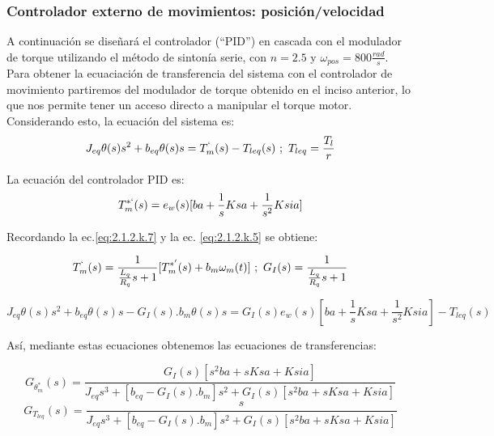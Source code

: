 \documentclass[10pt]{article}
\begin{document}
\subsubsection{Controlador externo de movimientos: posición/velocidad }
A continuación se diseñará el controlador (``PID'') en cascada con el modulador de torque utilizando el método de sintonía serie, con $n=2.5$ y $\omega_{pos}=800\frac{rad}{s}$. Para obtener la ecuaciación de transferencia del sistema con el controlador de movimiento partiremos del modulador de torque obtenido en el inciso anterior, lo que nos permite tener un acceso directo a manipular el torque motor. Considerando esto, la ecuación del sistema es:
		\begin{equation}
	J_{eq}\theta(s)s^{2}+b_{eq}\theta(s)s=T^{`}_{m}(s)-T_{leq}(s) \ ; \ T_{leq}= \frac{T_{l}}{r}
	\label{eq:2.1.2.q.1}
	\end{equation}
	
La ecuación del controlador PID es:
		\begin{equation}
	T^{*`}_{m}(s)=e_{w}(s)[ba+\frac{1}{s}Ksa + \frac{1}{s^{2}}Ksia]
	\label{eq:2.1.2.q.2}
	\end{equation}
	
Recordando la ec.\ref{eq:2.1.2.k.7} y la ec. \ref{eq:2.1.2.k.5} se obtiene:

	\begin{equation}
	T^{`}_{m}(s)=\frac{1}{\frac{L_{q}}{R_{q}}s+1}[T^{*'}_{m}(s)+b_{m}\omega_{m}(t)] \ ; \ G_{I}(s)=\frac{1}{\frac{L_{q}}{R_{q}}s+1}
	\label{eq:2.1.2.q.4}
	\end{equation}

	\begin{equation}
	J_{eq}\theta(s)s^{2}+b_{eq}\theta(s)s-G_{I}(s).b_{m}\theta(s)s=G_{I}(s)e_{w}(s)[ba+\frac{1}{s}Ksa + \frac{1}{s^{2}}Ksia]-T_{leq}(s)
	\label{eq:2.1.2.q.5}
	\end{equation}
	
Así, mediante estas ecuaciones obtenemos las ecuaciones de transferencias:
 
	\begin{equation}
	G_{\theta^{*}_{m}}(s)=\frac{G_{I}(s)[s^{2}ba+sKsa+Ksia]}{J_{eq}s^{3}+[b_{eq}-G_{I}(s).b_{m}]s^{2}+G_{I}(s)[s^{2}ba+sKsa+Ksia]}
	\label{eq:2.1.2.q.6}
	\end{equation}
 	\begin{equation}
	G_{T_{leq}}(s)=\frac{s}{J_{eq}s^{3}+[b_{eq}-G_{I}(s).b_{m}]s^{2}+G_{I}(s)[s^{2}ba+sKsa+Ksia]}
	\label{eq:2.1.2.q.6}
	\end{equation}
	
\end{document}
